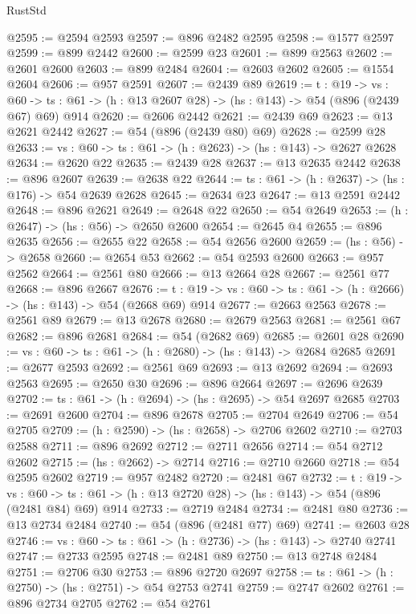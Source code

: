 \begin{lexlean}{RustStd}
\begin{coremodule}
@2595 := @2594 @2593
@2597 := @896 @2482 @2595
@2598 := @1577 @2597
@2599 := @899 @2442
@2600 := @2599 @23
@2601 := @899 @2563
@2602 := @2601 @2600
@2603 := @899 @2484
@2604 := @2603 @2602
@2605 := @1554 @2604
@2606 := @957 @2591
@2607 := @2439 @89
@2619 := {t : @19} ->
  {vs : @60} -> {ts : @61} -> (h : @13 @2607 @28) -> (hs : @143) -> @54 (@896 (@2439 @67) @69) @914
@2620 := @2606 @2442
@2621 := @2439 @69
@2623 := @13 @2621 @2442
@2627 := @54 (@896 (@2439 @80) @69)
@2628 := @2599 @28
@2633 := {vs : @60} -> {ts : @61} -> (h : @2623) -> (hs : @143) -> @2627 @2628
@2634 := @2620 @22
@2635 := @2439 @28
@2637 := @13 @2635 @2442
@2638 := @896 @2607
@2639 := @2638 @22
@2644 := {ts : @61} -> (h : @2637) -> (hs : @176) -> @54 @2639 @2628
@2645 := @2634 @23
@2647 := @13 @2591 @2442
@2648 := @896 @2621
@2649 := @2648 @22
@2650 := @54 @2649
@2653 := (h : @2647) -> (hs : @56) -> @2650 @2600
@2654 := @2645 @4
@2655 := @896 @2635
@2656 := @2655 @22
@2658 := @54 @2656 @2600
@2659 := (hs : @56) -> @2658
@2660 := @2654 @53
@2662 := @54 @2593 @2600
@2663 := @957 @2562
@2664 := @2561 @80
@2666 := @13 @2664 @28
@2667 := @2561 @77
@2668 := @896 @2667
@2676 := {t : @19} -> {vs : @60} -> {ts : @61} -> (h : @2666) -> (hs : @143) -> @54 (@2668 @69) @914
@2677 := @2663 @2563
@2678 := @2561 @89
@2679 := @13 @2678
@2680 := @2679 @2563
@2681 := @2561 @67
@2682 := @896 @2681
@2684 := @54 (@2682 @69)
@2685 := @2601 @28
@2690 := {vs : @60} -> {ts : @61} -> (h : @2680) -> (hs : @143) -> @2684 @2685
@2691 := @2677 @2593
@2692 := @2561 @69
@2693 := @13 @2692
@2694 := @2693 @2563
@2695 := @2650 @30
@2696 := @896 @2664
@2697 := @2696 @2639
@2702 := {ts : @61} -> (h : @2694) -> (hs : @2695) -> @54 @2697 @2685
@2703 := @2691 @2600
@2704 := @896 @2678
@2705 := @2704 @2649
@2706 := @54 @2705
@2709 := (h : @2590) -> (hs : @2658) -> @2706 @2602
@2710 := @2703 @2588
@2711 := @896 @2692
@2712 := @2711 @2656
@2714 := @54 @2712 @2602
@2715 := (hs : @2662) -> @2714
@2716 := @2710 @2660
@2718 := @54 @2595 @2602
@2719 := @957 @2482
@2720 := @2481 @67
@2732 := {t : @19} ->
  {vs : @60} -> {ts : @61} -> (h : @13 @2720 @28) -> (hs : @143) -> @54 (@896 (@2481 @84) @69) @914
@2733 := @2719 @2484
@2734 := @2481 @80
@2736 := @13 @2734 @2484
@2740 := @54 (@896 (@2481 @77) @69)
@2741 := @2603 @28
@2746 := {vs : @60} -> {ts : @61} -> (h : @2736) -> (hs : @143) -> @2740 @2741
@2747 := @2733 @2595
@2748 := @2481 @89
@2750 := @13 @2748 @2484
@2751 := @2706 @30
@2753 := @896 @2720 @2697
@2758 := {ts : @61} -> (h : @2750) -> (hs : @2751) -> @54 @2753 @2741
@2759 := @2747 @2602
@2761 := @896 @2734 @2705
@2762 := @54 @2761

\end{coremodule}
\end{lexlean}
